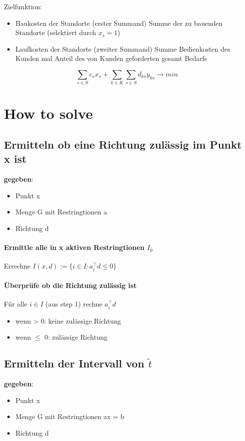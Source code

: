\documentclass[12pt,a4paper, hyperref]{article}
\newcommand{\tsnake}[1]{\ensuremath{\tilde{#1}}}
\begin{document}
Zielfunktion:
\begin{itemize}
\item Baukosten der Standorte (erster Summand) Summe der zu bauenden Standorte (selektiert durch $x_s = 1$)
\item Laufkosten der Standorte (zweiter Summand) Summe Bedienkosten des Kunden mal Anteil des von Kunden geforderten gesamt Bedarfs
\end{itemize}
\[ \sum_{s\in S}c_{s}x_{s} + \sum_{k\in K} \sum_{s\in S} d_{ks}y_{ks} \rightarrow min \]


\section{How to solve}

\subsection{Ermitteln ob eine Richtung zulässig im Punkt x ist}
\textbf{gegeben}:
\begin{itemize}
\item Punkt x
\item Menge G mit Restringtionen a
\item Richtung d
\end{itemize}
\paragraph{Ermittle alle in x aktiven Restringtionen $I_0$\\}

Errechne $I(x,d) := \{i \in I: a_{i}^\intercal d \leq 0\}$\\

\paragraph{Überprüfe ob die Richtung zulässig ist\\}
Für alle $i \in I$ (aus step 1) rechne $a_{i}^\intercal d$
\begin{itemize}
\item wenn > 0: keine zulässige Richtung
\item wenn $\leq$ 0: zulässige Richtung
\end{itemize}

\subsection{Ermitteln der Intervall von \tsnake t}
\textbf{gegeben}:
\begin{itemize}
\item Punkt x
\item Menge G mit Restringtionen ax = b
\item Richtung d
\end{itemize} 
\end{document}
